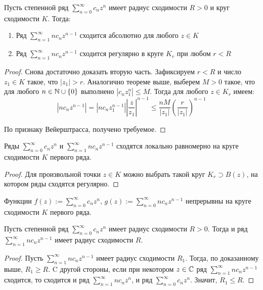 \begin{proposition}
	Пусть степенной ряд $\sum_{n=0}^\infty c_nz^n$ имеет радиус сходимости $R > 0$ и круг сходимости $K$. Тогда:
	\begin{enumerate}
		\item Ряд $\sum_{n = 1}^\infty nc_nz^{n-1}$ сходится абсолютно для любого $z \in K$
		\item Ряд $\sum_{n = 1}^\infty nc_nz^{n-1}$ сходится регулярно в круге $K_r$ при любом $r < R$
	\end{enumerate}
\end{proposition}

\begin{proof}
	Снова достаточно доказать вторую часть. Зафиксируем $r < R$ и число $z_1 \in K$ такое, что $|z_1| > r$. Аналогично теореме выше, выберем $M > 0$ такое, что для любого $n \in \mathbb{N} \cup \{0\}$ выполнено $|c_nz_1^n| \le M$. Тогда для любого $z \in K_r$ имеем:
	\[\left|nc_nz^{n-1}\right| = \left|nc_nz_1^{n-1}\right|\left|\frac{z}{z_1}\right|^{n-1} \le \frac{nM}{|z_1|}\left(\frac{r}{|z_1|}\right)^{n-1}\]
	
	По признаку Вейерштрасса, получено требуемое.
\end{proof}

\begin{corollary}
	Ряды $\sum_{n=0}^\infty c_nz^n$ и $\sum_{n = 1}^\infty nc_nz^{n-1}$ сходятся локально равномерно на круге сходимости $K$ первого ряда.
\end{corollary}

\begin{proof}
	Для произвольной точки $z \in K$ можно выбрать такой круг $K_r \supset B(z)$, на котором ряды сходятся регулярно.
\end{proof}

\begin{corollary}
	Функции $f(z) := \sum_{n = 0}^\infty c_nz^n$, $g(z) := \sum_{n = 0}^\infty nc_nz^{n-1}$ непрерывны на круге сходимости $K$ первого ряда.
\end{corollary}

\begin{corollary}
	Пусть степенной ряд $\sum_{n=0}^\infty c_nz^n$ имеет радиус сходимости $R > 0$. Тогда и ряд $\sum_{n = 1}^\infty nc_nz^{n-1}$ имеет радиус сходимости $R$.
\end{corollary}

\begin{proof}
	Пусть $\sum_{n = 1}^\infty nc_nz^{n-1}$ имеет радиус сходимости $R_1$. Тогда, по доказанному выше, $R_1 \ge R$. C другой стороны, если при некотором $z \in \mathbb{C}$ ряд $\sum_{n = 1}^\infty nc_nz^{n-1}$ сходится, то сходится и ряд $\sum_{n = 1}^\infty nc_nz^n$, и ряд $\sum_{n = 0}^\infty c_nz^n$. Значит, $R_1 \le R$.
\end{proof}

